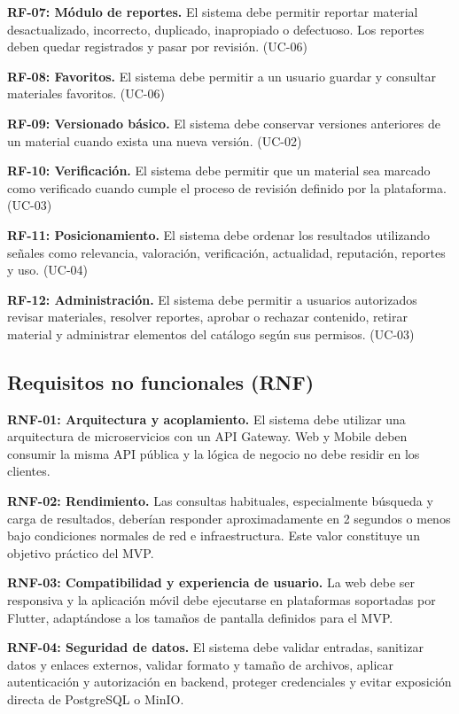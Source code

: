 \documentclass[12pt,a4paper]{article}
\begin{document}
\noindent\textbf{RF-07: Módulo de reportes.} El sistema debe permitir reportar material desactualizado, incorrecto, duplicado, inapropiado o defectuoso. Los reportes deben quedar registrados y pasar por revisión. (UC-06)

\noindent\textbf{RF-08: Favoritos.} El sistema debe permitir a un usuario guardar y consultar materiales favoritos. (UC-06)

\noindent\textbf{RF-09: Versionado básico.} El sistema debe conservar versiones anteriores de un material cuando exista una nueva versión. (UC-02)

\noindent\textbf{RF-10: Verificación.} El sistema debe permitir que un material sea marcado como verificado cuando cumple el proceso de revisión definido por la plataforma. (UC-03)

\noindent\textbf{RF-11: Posicionamiento.} El sistema debe ordenar los resultados utilizando señales como relevancia, valoración, verificación, actualidad, reputación, reportes y uso. (UC-04)

\noindent\textbf{RF-12: Administración.} El sistema debe permitir a usuarios autorizados revisar materiales, resolver reportes, aprobar o rechazar contenido, retirar material y administrar elementos del catálogo según sus permisos. (UC-03)

\subsection{Requisitos no funcionales (RNF)}

\noindent\textbf{RNF-01: Arquitectura y acoplamiento.} El sistema debe utilizar una arquitectura de microservicios con un API Gateway. Web y Mobile deben consumir la misma API pública y la lógica de negocio no debe residir en los clientes.

\noindent\textbf{RNF-02: Rendimiento.} Las consultas habituales, especialmente búsqueda y carga de resultados, deberían responder aproximadamente en 2 segundos o menos bajo condiciones normales de red e infraestructura. Este valor constituye un objetivo práctico del MVP.

\noindent\textbf{RNF-03: Compatibilidad y experiencia de usuario.} La web debe ser responsiva y la aplicación móvil debe ejecutarse en plataformas soportadas por Flutter, adaptándose a los tamaños de pantalla definidos para el MVP.

\noindent\textbf{RNF-04: Seguridad de datos.} El sistema debe validar entradas, sanitizar datos y enlaces externos, validar formato y tamaño de archivos, aplicar autenticación y autorización en backend, proteger credenciales y evitar exposición directa de PostgreSQL o MinIO.
\end{document}
